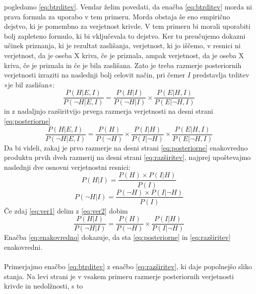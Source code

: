 \documentclass[mat1, tisk]{fmfdelo}
\theoremstyle{definition} %
\theoremstyle{trditev} %
\theoremstyle{izrek}
\begin{document}
pogledamo \eqref{eq:btrditev}. Vendar želim povedati, da enačba \eqref{eq:btrditev} morda ni prava formula za uporabo v tem primeru. Morda obstaja še eno empirično dejstvo, 
ki je pomembno za verjetnost krivde. V tem primeru bi morali uporabiti bolj zapleteno formulo, ki bi vključevala to dejstvo. Ker tu preučujemo 
dokazni učinek priznanja, ki je rezultat zaslišanja, verjetnost, ki jo iščemo, v resnici ni verjetnost, da je oseba X kriva, če je priznala, 
ampak verjetnost, da je oseba X kriva, če je priznala in če je bila zaslišana. Zato je treba razmerje posteriornih verjetnosti izraziti na 
naslednji bolj celovit način, pri čemer $I$ predstavlja trditev »je bil zaslišan«:
\begin{equation}\label{eq:posteriorne}
    \frac{P(H \lvert E, I)}{P(\neg H \lvert E, I)} = \frac{P(H \lvert I)}{P(\neg H \lvert I)}  \times \frac{P(E \lvert H, I)}{P(E \lvert \neg H, I)}
\end{equation}
in z nadaljnjo razširitvijo prvega razmerja verjetnosti na desni strani \eqref{eq:posteriorne}
\begin{equation}\label{eq:razširitev}
    \frac{P(H \lvert E, I)}{P(\neg H \lvert E, I)} = \frac{P(H)}{P(\neg H)} \times \frac{P(I \lvert H)}{P(I \lvert \neg H)}  \times \frac{P(E \lvert H, I)}{P(E \lvert \neg H, I)}
\end{equation}
Da bi videli, zakaj je prvo razmerje na desni strani \eqref{eq:posteriorne} enakovredno produktu prvih dveh razmerij na desni strani \eqref{eq:razširitev}, najprej upoštevajmo naslednji dve osnovni verjetnostni resnici:
\begin{equation}\label{eq:ver1}
    P(H \lvert I) = \frac{P(H) \times P(I \lvert H)}{P(I)}
\end{equation}
\begin{equation}\label{eq:ver2}
    P(\neg H \lvert I) = \frac{P(\neg H) \times P(I \lvert \neg H)}{P(I)}
\end{equation}
Če zdaj \eqref{eq:ver1} delim z \eqref{eq:ver2} dobim
\begin{equation}\label{eq:enakovredno}
    \frac{P(H \lvert I)}{P(\neg H \lvert I)} = \frac{P(H)}{P(\neg H)}  \times \frac{P(I \lvert H)}{P(I \lvert \neg H)}
\end{equation}
Enačba \eqref{eq:enakovredno} dokazuje, da sta \eqref{eq:posteriorne} in \eqref{eq:razširitev} enakovredni.\\\\
Primerjajmo enačbo \eqref{eq:btrditev} z enačbo \eqref{eq:razširitev}, ki daje popolnejšo sliko stanja. Na levi strani je v vsakem primeru razmerje posteriornih verjetnosti krivde in nedolžnosti, s to 
\end{document}
